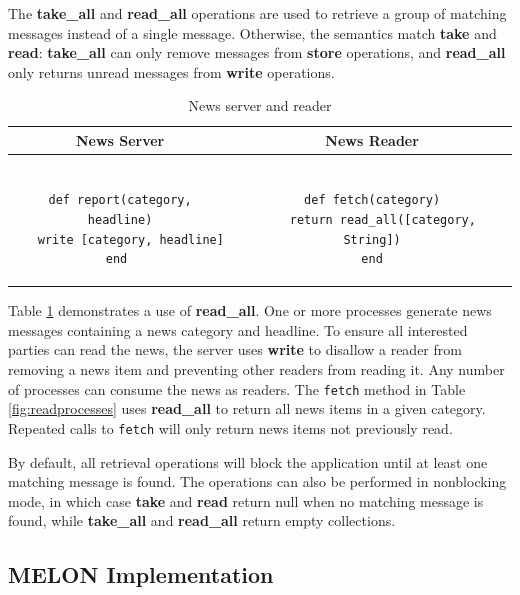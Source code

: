 \documentclass{llncs}
\begin{document}
The \textbf{take\_all} and \textbf{read\_all} operations are used to retrieve a group of matching messages instead of a single message. Otherwise, the semantics match \textbf{take} and \textbf{read}: \textbf{take\_all} can only remove messages from \textbf{store} operations, and \textbf{read\_all} only returns unread messages from \textbf{write} operations.

\begin{table}
\centering
\caption{News server and reader}
\begin{tabular}{|c|c|} \hline
\textbf{News Server} & \textbf{News Reader} \\ \hline
\begin{minipage}{2.45in}
\begin{verbatim}

def report(category, headline)
   write [category, headline]
end 
\end{verbatim}
\end{minipage}
&
\begin{minipage}{2.5in}
\begin{verbatim}

def fetch(category)
   return read_all([category, String])
end
\end{verbatim}
\end{minipage}
\\ \hline
\end{tabular}
\label{fig:newsreader}
\end{table}

Table \ref{fig:newsreader} demonstrates a use of \textbf{read\_all}. One or more processes generate news messages containing a news category and headline. To ensure all interested parties can read the news, the server uses \textbf{write} to disallow a reader from removing a news item and preventing other readers from reading it. Any number of processes can consume the news as readers. The \texttt{fetch} method in Table \ref{fig:readprocesses} uses \textbf{read\_all} to return all news items in a given category. Repeated calls to \texttt{fetch} will only return news items not previously read.

By default, all retrieval operations will block the application until at least one matching message is found. The operations can also be performed in nonblocking mode, in which case \textbf{take} and \textbf{read} return null when no matching message is found, while \textbf{take\_all} and \textbf{read\_all} return empty collections.
   
\subsection{MELON Implementation}\label{sec:implementation}
\end{document}
